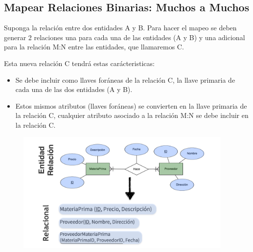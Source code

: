 \documentclass[12pt, fleqn]{report}                             %
\theoremstyle{break}                                            %
\begin{document}
            \clearpage
            \subsection{Mapear Relaciones Binarias: Muchos a Muchos}

                Suponga la relación entre dos entidades A y B.
                Para hacer el mapeo se deben generar 2 relaciones una para cada una de las entidades (A y B) y
                una adicional para la relación M:N entre las entidades, que llamaremos C.

                Esta nueva relación C tendrá estas carácteristicas:

                \begin{itemize}
                    \item
                        Se debe incluir como llaves foráneas de la relación C, la llave primaria de cada
                        una de las dos entidades (A y B).
                    \item
                        Estos mismos atributos (llaves foráneas) se convierten en la llave primaria de la
                        relación C, cualquier atributo asociado a la relación M:N se debe incluir en la relación C.
                \end{itemize}

                \begin{figure}[h]
                    \centering
                    \includegraphics[width=0.95\textwidth]{MapeoRelacionesBinariasMuchosMuchos}
                \end{figure}
\end{document}
